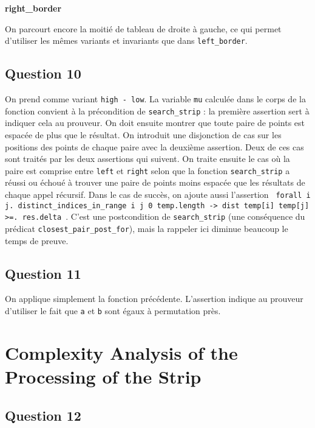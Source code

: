 \documentclass[11pt, openany, a4paper]{article}
\newcommand{\clofor}{\texttt{closest\_pair\_post\_for}}
\begin{document}
\vspace{1em}

\textbf{right\_border}

On parcourt encore la moitié de tableau de droite à gauche, ce qui permet d'utiliser les mêmes variants et invariants que dans \texttt{left\_border}.

\subsection*{Question 10}

On prend comme variant \texttt{high - low}. La variable \texttt{mu} calculée dans le corps de la fonction convient à la précondition de \texttt{search\_strip} : la première assertion sert à indiquer cela au prouveur. On doit ensuite montrer que toute paire de points est espacée de plus que le résultat. On introduit une disjonction de cas sur les positions des points de chaque paire avec la deuxième assertion. Deux de ces cas sont traités par les deux assertions qui suivent. On traite ensuite le cas où la paire est comprise entre \texttt{left} et \texttt{right} selon que la fonction \texttt{search\_strip} a réussi ou échoué à trouver une paire de points moins espacée que les résultats de chaque appel récursif. Dans le cas de succès, on ajoute aussi l'assertion \texttt{ forall i j. distinct\_indices\_in\_range i j 0 temp.length -> dist temp[i] temp[j] >=. res.delta }. C'est une postcondition de \texttt{search\_strip} (une conséquence du prédicat \clofor), mais la rappeler ici diminue beaucoup le temps de preuve.

\subsection*{Question 11}

On applique simplement la fonction précédente. L'assertion indique au prouveur d'utiliser le fait que \texttt{a} et \texttt{b} sont égaux à permutation près.

\section{Complexity Analysis of the Processing of the Strip}

\subsection*{Question 12}
\end{document}
